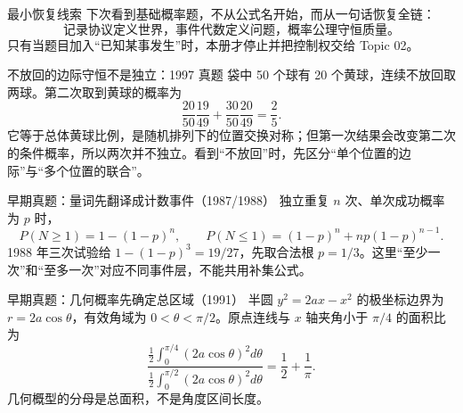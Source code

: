 \documentclass[11pt,a4paper]{ctexart}
\begin{document}
\begin{corebox}{最小恢复线索}
下次看到基础概率题，不从公式名开始，而从一句话恢复全链：
\[
\boxed{\text{记录协议定义世界，事件代数定义问题，概率公理守恒质量。}}
\]
只有当题目加入“已知某事发生”时，本册才停止并把控制权交给 Topic 02。
\end{corebox}

\begin{examplebox}{不放回的边际守恒不是独立：1997 真题}
袋中 50 个球有 20 个黄球，连续不放回取两球。第二次取到黄球的概率为
\[
\frac{20}{50}\frac{19}{49}+\frac{30}{50}\frac{20}{49}=\frac25.
\]
它等于总体黄球比例，是随机排列下的位置交换对称；但第一次结果会改变第二次的条件概率，所以两次并不独立。看到“不放回”时，先区分“单个位置的边际”与“多个位置的联合”。
\end{examplebox}

\begin{examplebox}{早期真题：量词先翻译成计数事件（1987/1988）}
独立重复 $n$ 次、单次成功概率为 $p$ 时，
\[
P(N\ge1)=1-(1-p)^n,\qquad P(N\le1)=(1-p)^n+np(1-p)^{n-1}.
\]
1988 年三次试验给 $1-(1-p)^3=19/27$，先取合法根 $p=1/3$。这里“至少一次”和“至多一次”对应不同事件层，不能共用补集公式。
\end{examplebox}

\begin{examplebox}{早期真题：几何概率先确定总区域（1991）}
半圆 $y^2=2ax-x^2$ 的极坐标边界为 $r=2a\cos\theta$，有效角域为 $0<\theta<\pi/2$。原点连线与 $x$ 轴夹角小于 $\pi/4$ 的面积比为
\[
\frac{\frac12\int_0^{\pi/4}(2a\cos\theta)^2d\theta}{\frac12\int_0^{\pi/2}(2a\cos\theta)^2d\theta}
=\frac12+\frac1\pi.
\]
几何概型的分母是总面积，不是角度区间长度。
\end{examplebox}
\end{document}

